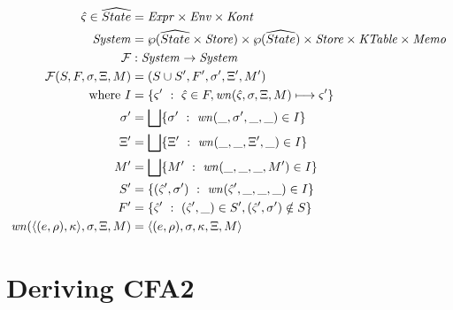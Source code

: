 \documentclass{llncs}
\begin{document}
\begin{align*}
  \hat\varsigma \in \widehat{State} &= \mathit{Expr} \times \mathit{Env} \times \mathit{Kont} \\
  \mathit{System} &= \wp(\widehat{State} \times \mathit{Store}) \times \wp(\widehat{State}) \times \mathit{Store} \times \mathit{KTable} \times \mathit{Memo} \\
  {\mathcal F} &: \mathit{System} \to \mathit{System} \\
  {\mathcal F}(S, F, \sigma, \Xi, M) &= (S \cup S', F', \sigma', \Xi', M') \\
  \text{where } I &= \{ \varsigma'\ :\ \hat\varsigma \in F, \mathit{wn}(\hat\varsigma,\sigma,\Xi,M) \longmapsto \varsigma'\} \\
                \sigma' &= \bigsqcup\{ \sigma'\ :\ \mathit{wn}(\_, \sigma',\_,\_) \in I\} \\
                \Xi' &=  \bigsqcup\{ \Xi'\ :\ \mathit{wn}(\_, \_, \Xi', \_) \in I\} \\
                M' &=  \bigsqcup\{ M'\ :\ \mathit{wn}(\_, \_, \_, M') \in I\} \\
                S' &= \{ (\hat\varsigma',\sigma')\ :\ \mathit{wn}(\hat\varsigma', \_, \_, \_) \in I\} \\
                F' &= \{ \hat\varsigma'\ :\ (\hat\varsigma',\_) \in S', (\hat\varsigma',\sigma') \notin S\} \\
                \mathit{wn}(\langle (e,\rho),\kappa \rangle,\sigma,\Xi,M) &= \langle (e,\rho),\sigma,\kappa,\Xi,M \rangle
\end{align*}

\section{Deriving CFA2}
\label{sec:cfa2}
\end{document}
